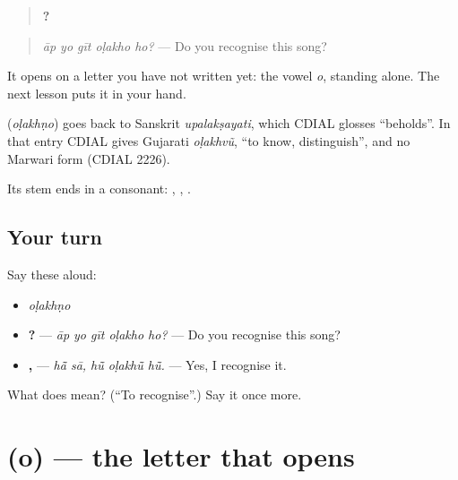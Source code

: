 \begin{quote}
\textbf{    ?}
\end{quote}

\begin{quote}
\emph{āp yo gīt oḷakho ho?} — Do you recognise this song?
\end{quote}

It opens on a letter you have not written yet: the vowel \emph{o}, standing alone. The next lesson puts it in your hand.

\begin{cousinweb}
\textbf{} (\emph{oḷakhṇo}) goes back to Sanskrit \emph{upalakṣayati}, which CDIAL glosses \textquotedblleft{}beholds\textquotedblright{}. In that entry CDIAL gives Gujarati \emph{oḷakhvũ}, \textquotedblleft{}to know, distinguish\textquotedblright{}, and no Marwari form (CDIAL 2226).
\end{cousinweb}

\begin{grammarlens}[title={What you've built}]
Its stem \textbf{} ends in a consonant: \textbf{ }, \textbf{ }, \textbf{ }.
\end{grammarlens}

\subsection*{Your turn}
Say these aloud:

\begin{itemize}
\raggedright
  \item \emph{oḷakhṇo}
  \item \textbf{    ?} — \emph{āp yo gīt oḷakho ho?} — Do you recognise this song?
  \item \textbf{ ,   } — \emph{hā̃ sā, hū̃ oḷakhū̃ hū̃.} — Yes, I recognise it.
\end{itemize}

\begin{tcolorbox}[breakable,colback=teal!4,colframe=teal!35!black,title={Before you move on}]
What does \textbf{} mean? (\textquotedblleft{}To recognise\textquotedblright{}.) Say it once more.
\end{tcolorbox}
\section[\texorpdfstring{\mw{ओ} (o)}{ओ (o)}]{ (o) — the letter that opens }

